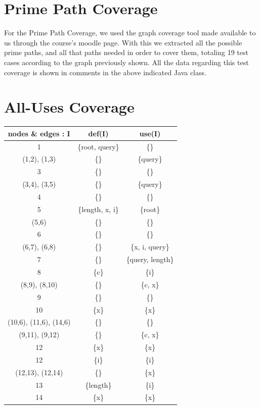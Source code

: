 \documentclass[12pt]{article}
\begin{document}
\section[Prime Path Coverage]{Prime Path Coverage}
For the Prime Path Coverage, we used the graph coverage tool made available to us through the course's moodle page. With this we extracted all the possible prime paths, and all that paths needed in order to cover them, totaling 19 test cases according to the graph previously shown. All the data regarding this test coverage is shown in comments in the above indicated Java class.

\newpage
\section[All-Uses Coverage]{All-Uses Coverage}

\begin{table}[htb]
\centering
\begin{tabular}{| c | c | c |} 
 \hline
 \textbf{nodes \& edges : I} & \textbf{def(I}) & \textbf{use(I)} \\ \hline
 1                      & \{root, query\} & \{\} \\ \hline
 (1,2), (1,3)           & \{\} & \{query\} \\ \hline
 3                      & \{\} & \{\} \\ \hline
 (3,4), (3,5)           & \{\} & \{query\} \\ \hline
 4                      & \{\} & \{\} \\ \hline
 5                      & \{length, x, i\} & \{root\} \\ \hline
 (5,6)                  & \{\} & \{\} \\ \hline
 6                      & \{\} & \{\} \\ \hline
 (6,7), (6,8)           & \{\} & \{x, i, query\} \\ \hline
 7                      & \{\} & \{query, length\} \\ \hline
 8                      & \{c\} & \{i\} \\ \hline
 (8,9), (8,10)          & \{\} & \{c, x\} \\ \hline
 9                      & \{\} & \{\} \\ \hline
 10                     & \{x\} & \{x\} \\ \hline
 (10,6), (11,6), (14,6) & \{\} & \{\} \\ \hline
 (9,11), (9,12)         & \{\} & \{c, x\} \\ \hline
 12                     & \{x\} & \{x\} \\ \hline
 12                     & \{i\} & \{i\} \\ \hline
 (12,13), (12,14)       & \{\} & \{x\} \\ \hline
 13                     & \{length\} & \{i\} \\ \hline
 14                     & \{x\} & \{x\} \\ \hline
\end{tabular}
\end{table}
\end{document}
